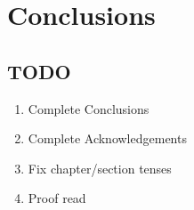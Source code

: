 \chapter{Conclusions}

\section{TODO}
\begin{enumerate}
\item Complete Conclusions
\item Complete Acknowledgements
\item Fix chapter/section tenses
\item Proof read
\end{enumerate}

